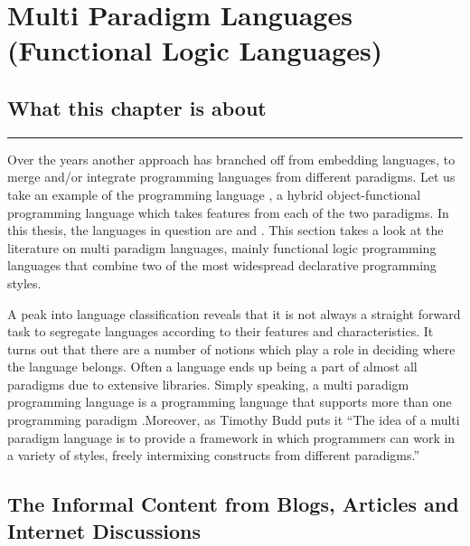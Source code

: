 \documentclass[thesis-solanki.tex]{subfiles}
\begin{document}
\chapter{Multi Paradigm Languages (Functional Logic Languages)}\label{chap:multiparadigm}


\section{What this chapter is about}

\noindent\rule{\textwidth}{0.5pt}


Over the years another approach has branched off from embedding languages, to merge and/or integrate programming
languages from different paradigms.
Let us take an example of the  programming language \cite{website:scala}, a hybrid
object-functional programming language which takes features from each of the two paradigms.
In this thesis, the languages in question are  and .
This section takes a look at the literature on multi paradigm languages, mainly functional logic programming
languages that combine two of the most widespread declarative programming styles.

A peak into language classification reveals that it is not always a straight forward task to segregate languages
according to their features and characteristics.
It turns out that there are a number of notions which play a role in deciding where the language belongs.
Often a language ends up being a part of almost all paradigms due to extensive libraries.
Simply speaking, a multi paradigm programming language is a programming language that supports more than one
programming paradigm \cite{Krishnamurthi:2008:TPL:1480828.1480846}.Moreover, as Timothy Budd puts it
\cite{website:wikimultiparadigm} ``The idea of a multi paradigm language is to provide a framework in which
programmers can work in a variety of styles, freely intermixing constructs from different paradigms.''


\section{The Informal Content from Blogs, Articles and Internet Discussions}
  
\end{document}
